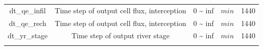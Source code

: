 \documentclass[]{scrbook}
\begin{document}
\begin{longtable}[]{@{}ccccc@{}}
\begin{minipage}[t]{0.17\columnwidth}
dt\_qe\_infil\strut
\end{minipage} & \begin{minipage}[t]{0.23\columnwidth}\centering\strut
Time step of output cell flux, interception\strut
\end{minipage} & \begin{minipage}[t]{0.10\columnwidth}\centering\strut
0 \textasciitilde{} inf\strut
\end{minipage} & \begin{minipage}[t]{0.10\columnwidth}\centering\strut
\(min\)\strut
\end{minipage} & \begin{minipage}[t]{0.26\columnwidth}\centering\strut
1440\strut
\end{minipage}\tabularnewline
\begin{minipage}[t]{0.17\columnwidth}\centering\strut
dt\_qe\_rech\strut
\end{minipage} & \begin{minipage}[t]{0.23\columnwidth}\centering\strut
Time step of output cell flux, interception\strut
\end{minipage} & \begin{minipage}[t]{0.10\columnwidth}\centering\strut
0 \textasciitilde{} inf\strut
\end{minipage} & \begin{minipage}[t]{0.10\columnwidth}\centering\strut
\(min\)\strut
\end{minipage} & \begin{minipage}[t]{0.26\columnwidth}\centering\strut
1440\strut
\end{minipage}\tabularnewline
\begin{minipage}[t]{0.17\columnwidth}\centering\strut
dt\_yr\_stage\strut
\end{minipage} & \begin{minipage}[t]{0.23\columnwidth}\centering\strut
Time step of output river stage\strut
\end{minipage} & \begin{minipage}[t]{0.10\columnwidth}\centering\strut
0 \textasciitilde{} inf\strut
\end{minipage} & \begin{minipage}[t]{0.10\columnwidth}\centering\strut
\(min\)\strut
\end{minipage} & \begin{minipage}[t]{0.26\columnwidth}\centering\strut
1440\strut
\end{minipage}\tabularnewline
\begin{minipage}[t]{0.17\columnwidth}\centering\strut

\end{minipage}
\end{longtable}
\end{document}
